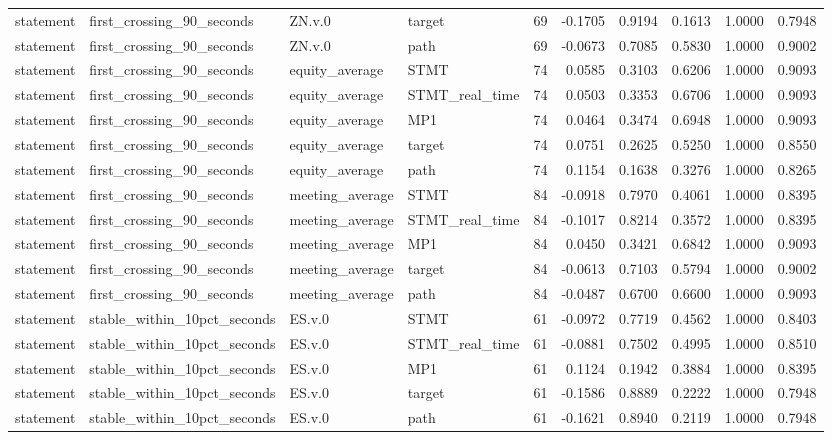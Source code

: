 \begin{tabular}{llllrrrrrr}
statement & first_crossing_90_seconds & ZN.v.0 & target & 69 & -0.1705 & 0.9194 & 0.1613 & 1.0000 & 0.7948 \\
statement & first_crossing_90_seconds & ZN.v.0 & path & 69 & -0.0673 & 0.7085 & 0.5830 & 1.0000 & 0.9002 \\
statement & first_crossing_90_seconds & equity_average & STMT & 74 & 0.0585 & 0.3103 & 0.6206 & 1.0000 & 0.9093 \\
statement & first_crossing_90_seconds & equity_average & STMT_real_time & 74 & 0.0503 & 0.3353 & 0.6706 & 1.0000 & 0.9093 \\
statement & first_crossing_90_seconds & equity_average & MP1 & 74 & 0.0464 & 0.3474 & 0.6948 & 1.0000 & 0.9093 \\
statement & first_crossing_90_seconds & equity_average & target & 74 & 0.0751 & 0.2625 & 0.5250 & 1.0000 & 0.8550 \\
statement & first_crossing_90_seconds & equity_average & path & 74 & 0.1154 & 0.1638 & 0.3276 & 1.0000 & 0.8265 \\
statement & first_crossing_90_seconds & meeting_average & STMT & 84 & -0.0918 & 0.7970 & 0.4061 & 1.0000 & 0.8395 \\
statement & first_crossing_90_seconds & meeting_average & STMT_real_time & 84 & -0.1017 & 0.8214 & 0.3572 & 1.0000 & 0.8395 \\
statement & first_crossing_90_seconds & meeting_average & MP1 & 84 & 0.0450 & 0.3421 & 0.6842 & 1.0000 & 0.9093 \\
statement & first_crossing_90_seconds & meeting_average & target & 84 & -0.0613 & 0.7103 & 0.5794 & 1.0000 & 0.9002 \\
statement & first_crossing_90_seconds & meeting_average & path & 84 & -0.0487 & 0.6700 & 0.6600 & 1.0000 & 0.9093 \\
statement & stable_within_10pct_seconds & ES.v.0 & STMT & 61 & -0.0972 & 0.7719 & 0.4562 & 1.0000 & 0.8403 \\
statement & stable_within_10pct_seconds & ES.v.0 & STMT_real_time & 61 & -0.0881 & 0.7502 & 0.4995 & 1.0000 & 0.8510 \\
statement & stable_within_10pct_seconds & ES.v.0 & MP1 & 61 & 0.1124 & 0.1942 & 0.3884 & 1.0000 & 0.8395 \\
statement & stable_within_10pct_seconds & ES.v.0 & target & 61 & -0.1586 & 0.8889 & 0.2222 & 1.0000 & 0.7948 \\
statement & stable_within_10pct_seconds & ES.v.0 & path & 61 & -0.1621 & 0.8940 & 0.2119 & 1.0000 & 0.7948 \\

\end{tabular}
